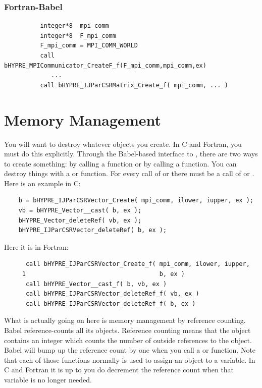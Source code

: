 \subsubsection{Fortran-Babel}
\begin{verbatim}
          integer*8  mpi_comm
          integer*8  F_mpi_comm
          F_mpi_comm = MPI_COMM_WORLD
          call bHYPRE_MPICommunicator_CreateF_f(F_mpi_comm,mpi_comm,ex)
             ...
          call bHYPRE_IJParCSRMatrix_Create_f( mpi_comm, ... )
\end{verbatim}

\section{Memory Management}
\label{sec-Memory}

You will want to destroy whatever objects you create.  In C and
Fortran, you must do this explicitly.  Through the Babel-based
interface to \hypre{}, there are two ways to create something: by
calling a  function or by calling a
 function. You can destroy things with a 
or  function.  For every call of  or
 there must be a call of  or
.  Here is an example in C:
\begin{verbatim}
    b = bHYPRE_IJParCSRVector_Create( mpi_comm, ilower, iupper, ex );
    vb = bHYPRE_Vector__cast( b, ex );
    bHYPRE_Vector_deleteRef( vb, ex );
    bHYPRE_IJParCSRVector_deleteRef( b, ex );
\end{verbatim}
Here it is in Fortran:
\begin{verbatim}
      call bHYPRE_IJParCSRVector_Create_f( mpi_comm, ilower, iupper,
     1                                     b, ex )
      call bHYPRE_Vector__cast_f( b, vb, ex )
      call bHYPRE_IJParCSRVector_deleteRef_f( vb, ex )
      call bHYPRE_IJParCSRVector_deleteRef_f( b, ex )
\end{verbatim}

What is actually going on here is memory management by reference
counting.  Babel reference-counts all its objects.  Reference
counting means that the object contains an integer which counts the
number of outside references to the object.  Babel will bump up the
reference count by one when you call a  or 
function.  Note that each of those functions normally is used to
assign an object to a variable.  In C and Fortran it is up to you do
decrement the reference count when that variable is no longer needed.

